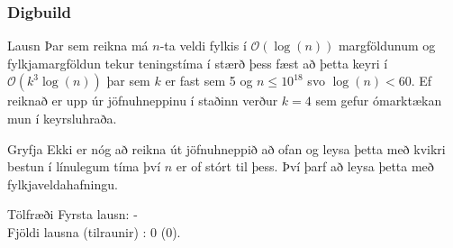 \documentclass{beamer}
\newcommand\env[2]
{
	\begin{#1}
	#2
	\end{#1}
}
\begin{document}
\env{frame}
{
	\frametitle{Digbuild}
	\small
	\env{block}
	{
		{Lausn}
		Þar sem reikna má $n$-ta veldi fylkis í $\mathcal{O}(\log(n))$ margföldunum og fylkjamargföldun
		tekur teningstíma í stærð þess fæst að þetta keyri í $\mathcal{O}(k^3\log(n))$ þar sem $k$ er
		fast sem 5 og $n \leq 10^{18}$ svo $\log(n) < 60$. Ef reiknað er upp úr jöfnuhneppinu í staðinn
		verður $k = 4$ sem gefur ómarktækan mun í keyrsluhraða.
	}
	\pause
	\env{block}
	{
		{Gryfja}
		Ekki er nóg að reikna út jöfnuhneppið að ofan og leysa þetta með kvikri bestun í línulegum tíma
		því $n$ er of stórt til þess. Því þarf að leysa þetta með fylkjaveldahafningu.
	}
	\pause
	\env{block}
	{
		{Tölfræði}
		Fyrsta lausn: -\\
		Fjöldi lausna (tilraunir) : 0 (0).
	}
}
\end{document}
